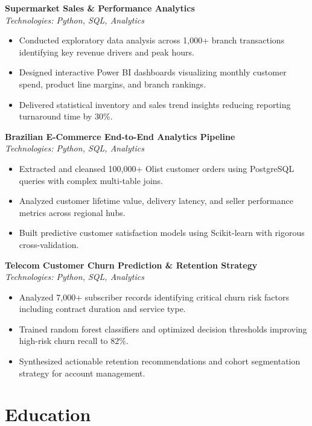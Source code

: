 \documentclass[a4paper,11pt]{article}
\newcommand{\resumeProjectHeading}[3]{
    \textbf{#1} \hfill #2 \\[1pt]
    \textit{Technologies: #3}
    \vspace{1pt}
}
\newcommand{\resumeItem}[1]{
    \item #1
}
\newcommand{\resumeProjectEnd}{
    \vspace{1.5pt}
}
\begin{document}
\resumeProjectHeading
{Supermarket Sales \& Performance Analytics}
{}
{Python, SQL, Analytics}
\begin{itemize}
    \resumeItem{Conducted exploratory data analysis across 1,000+ branch transactions identifying key revenue drivers and peak hours.}
    \resumeItem{Designed interactive Power BI dashboards visualizing monthly customer spend, product line margins, and branch rankings.}
    \resumeItem{Delivered statistical inventory and sales trend insights reducing reporting turnaround time by 30\%.}
\end{itemize}
\resumeProjectEnd
\vspace{0.10cm}
\resumeProjectHeading
{Brazilian E-Commerce End-to-End Analytics Pipeline}
{}
{Python, SQL, Analytics}
\begin{itemize}
    \resumeItem{Extracted and cleansed 100,000+ Olist customer orders using PostgreSQL queries with complex multi-table joins.}
    \resumeItem{Analyzed customer lifetime value, delivery latency, and seller performance metrics across regional hubs.}
    \resumeItem{Built predictive customer satisfaction models using Scikit-learn with rigorous cross-validation.}
\end{itemize}
\resumeProjectEnd
\vspace{0.10cm}
\resumeProjectHeading
{Telecom Customer Churn Prediction \& Retention Strategy}
{}
{Python, SQL, Analytics}
\begin{itemize}
    \resumeItem{Analyzed 7,000+ subscriber records identifying critical churn risk factors including contract duration and service type.}
    \resumeItem{Trained random forest classifiers and optimized decision thresholds improving high-risk churn recall to 82\%.}
    \resumeItem{Synthesized actionable retention recommendations and cohort segmentation strategy for account management.}
\end{itemize}
\resumeProjectEnd





\section*{Education}
\end{document}
